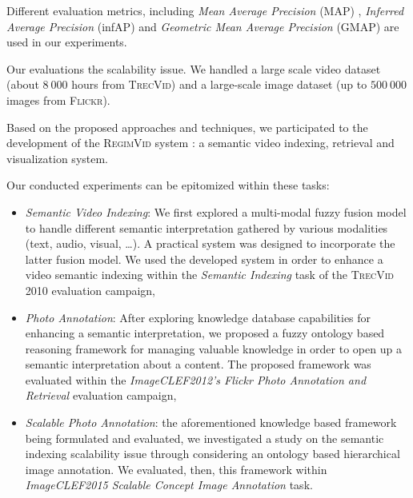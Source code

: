	Different evaluation metrics, including \emph{Mean Average Precision} (\gls{MAP})
	\citep{Schoeffmann2012}, \emph{Inferred Average Precision} (\gls{infAP}) \citep{Yilmaz2008} and 
	\emph{Geometric Mean Average Precision} (\gls{GMAP}) \citep{Thomee2012} are used in our experiments. 

	Our evaluations  the scalability issue. We handled a large scale video 
	dataset (about $8~000$ hours from \textsc{\gls{TrecVid}}) and a large-scale image dataset 
	(up to $500~000$ images from \textsc{Flickr}).

	Based on the proposed approaches and techniques, we participated to the development 
	of the \textsc{RegimVid} system \citep{Elleuch2010,Feki2012,Ksibi2013}:  
	a semantic video indexing, retrieval and visualization system.

	Our conducted experiments can be epitomized within these tasks:
	\begin{itemize}

		\item \textit{Semantic Video Indexing}: We first explored a multi-modal fuzzy fusion model 
		to handle different semantic interpretation gathered by various modalities (text, audio, visual, \dots{}).  
		A practical system was designed to incorporate the latter fusion model. We used the developed system 
		in order to enhance a video semantic indexing within the \emph{Semantic Indexing} task of the 
		\textsc{\gls{TrecVid}} 2010 \citep{Elleuch2010,Zarka2011,Over2011} evaluation campaign,


		\item \textit{Photo Annotation}: After exploring knowledge database capabilities for enhancing 
		a semantic interpretation, we proposed a fuzzy ontology based reasoning framework for managing valuable 
		knowledge in order to open up a semantic interpretation about a content. The proposed framework was 
		evaluated within the \emph{ImageCLEF2012's Flickr Photo Annotation and Retrieval} 
		\citep{Thomee2012,Zarka2015} evaluation campaign,

		\item \textit{Scalable Photo Annotation}: the aforementioned knowledge based framework being formulated 
		and evaluated, we investigated a study on the semantic indexing scalability issue through considering 
		an ontology based hierarchical image annotation. We evaluated, then, this framework within 
		\textit{ImageCLEF2015 Scalable Concept Image Annotation} \citep{Gilbert2015,Villegas2015,Zarka2015a} task.

	\end{itemize}

